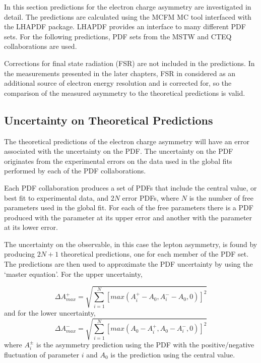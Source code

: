 In this section predictions for the electron charge asymmetry are investigated in
detail.  The predictions are calculated using the MCFM\cite{campbellmcfm} {MC} tool
interfaced with the LHAPDF package\cite{whalley2005houches}.  LHAPDF provides an
interface to many different {PDF} sets. For the following predictions, PDF sets from
the MSTW \cite{martin2009parton} and CTEQ \cite{lai2010vv} collaborations are
used.

Corrections for final state radiation (FSR) are not included in the predictions.
In the measurements presented in the later chapters, FSR in considered as an
additional source of electron energy resolution and is corrected for, so the
comparison of the measured asymmetry to the theoretical predictions is valid.

\subsection{Uncertainty on Theoretical Predictions}
The theoretical predictions of the electron charge asymmetry will have an error
associated with the uncertainty on the {PDF}.
The uncertainty on the {PDF} originates from the experimental errors on the
data used in the global fits performed by each of the {PDF} collaborations.

Each {PDF} collaboration produces a set of {PDFs} that include the
central value, or best fit to experimental data, and $2N$ error {PDFs}, where
$N$ is the number of free parameters used in the global
fit\cite{Bourilkov:2006cj}.
For each of the free parameters there is a PDF produced with the parameter at its upper
error and another with the parameter at its lower error. 

The uncertainty on the observable, in this case the lepton asymmetry, is found
by producing $2N+1$ theoretical predictions, one for each member of the {PDF}
set. The predictions are then used to approximate the {PDF} uncertainty by
using the `master equation'\cite{Bourilkov:2006cj,campbell2006hard}.
For the upper uncertainty,

\begin{equation}
\Delta A^{+}_{max}
= \sqrt{ \sum^{N}_{i=1} \left[ max( A^{+}_i-A_{0}, A^{-}_i-A_{0}, 0 ) \right]^{2}}
\end{equation}
and for the lower uncertainty,
\begin{equation}
\Delta A^{-}_{max}
= \sqrt{ \sum^{N}_{i=1} \left[ max( A_{0}-A^{+}_i, A_{0}-A^{-}_i, 0 ) \right]^{2}}
\end{equation}
where $A^{\pm}_{i}$ is the asymmetry prediction using the {PDF} with the
positive/negative fluctuation of parameter $i$ and $A_{0}$ is the prediction
using the central value.

